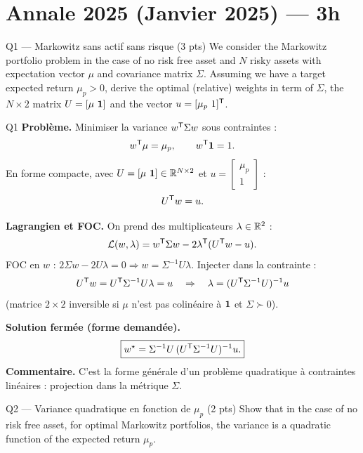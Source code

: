 \section{Annale 2025 (Janvier 2025) --- 3h}

\begin{questionbox}{Q1 --- Markowitz sans actif sans risque (3 pts)}
We consider the Markowitz portfolio problem in the case of no risk free asset and $N$ risky assets with expectation vector $\mu$ and covariance matrix $\Sigma$. Assuming we have a target expected return $\mu_p>0$, derive the optimal (relative) weights in term of $\Sigma$, the $N\times 2$ matrix $U=[\mu\ \mathbf{1}]$ and the vector $u=[\mu_p\ 1]^{\mathsf{T}}$.
\end{questionbox}

\begin{solutionbox}{Q1}
\textbf{Problème.} Minimiser la variance $w^{\mathsf{T}}\Sigma w$ sous contraintes :
\[
w^{\mathsf{T}}\mu=\mu_p,\qquad w^{\mathsf{T}}\mathbf{1}=1.
\]
En forme compacte, avec $U=[\mu\ \mathbf{1}]\in\mathbb{R}^{N\times 2}$ et $u=\begin{bmatrix}\mu_p\\1\end{bmatrix}$ :
\[
U^{\mathsf{T}} w = u.
\]

\medskip
\textbf{Lagrangien et FOC.} On prend des multiplicateurs $\lambda\in\mathbb{R}^2$ :
\[
\mathcal{L}(w,\lambda)=w^{\mathsf{T}}\Sigma w - 2\lambda^{\mathsf{T}}(U^{\mathsf{T}} w-u).
\]
FOC en $w$ : $2\Sigma w - 2U\lambda=0 \Rightarrow w=\Sigma^{-1}U\lambda$.
Injecter dans la contrainte :
\[
U^{\mathsf{T}} w = U^{\mathsf{T}}\Sigma^{-1}U\lambda = u
\quad\Rightarrow\quad
\lambda = (U^{\mathsf{T}}\Sigma^{-1}U)^{-1}u
\]
(matrice $2\times 2$ inversible si $\mu$ n'est pas colinéaire à $\mathbf{1}$ et $\Sigma\succ 0$).

\medskip
\textbf{Solution fermée (forme demandée).}
\[
\boxed{
w^\star
=
\Sigma^{-1}U\,(U^{\mathsf{T}}\Sigma^{-1}U)^{-1}u.
}
\]
\textbf{Commentaire.} C'est la forme générale d'un problème quadratique à contraintes linéaires : projection dans la métrique $\Sigma$.
\end{solutionbox}

\begin{questionbox}{Q2 --- Variance quadratique en fonction de $\mu_p$ (2 pts)}
Show that in the case of no risk free asset, for optimal Markowitz portfolios, the variance is a quadratic function of the expected return $\mu_p$.
\end{questionbox}

